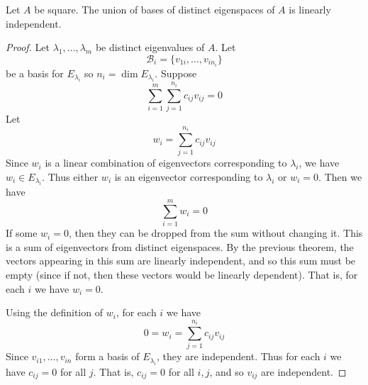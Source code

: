 \documentclass{article}
\begin{document}
    \begin{theorem}
      Let $A$ be square. The union of bases of distinct eigenspaces of $A$ is linearly independent.
    \end{theorem}
    \begin{proof}
      Let $\lambda_1, \ldots, \lambda_m$ be distinct eigenvalues of $A$. Let \[
        \mathcal{B}_i = \{v_{1i}, \dots, v_{in_i}\}
      \] be a basis for $E_{\lambda_i}$ so $n_i = \dim E_{\lambda_i}$. Suppose \[
        \sum_{i=1}^m\sum_{j=1}^{n_i} c_{ij}v_{ij} = 0
      \]
      Let \[
        w_i = \sum_{j=1}^{n_i} c_{ij}v_{ij}
      \]
      Since $w_i$ is a linear combination of eigenvectors corresponding to $\lambda_i$, we have $w_i \in E_{\lambda_i}$. Thus either $w_i$ is an eigenvector corresponding to $\lambda_i$ or $w_i = 0$. Then we have \[
        \sum_{i=1}^m w_i = 0
      \]
      If some $w_i = 0$, then they can be dropped from the sum without changing it. This is a sum of eigenvectors from distinct eigenspaces. By the previous theorem, the vectors appearing in this sum are linearly independent, and so this sum must be empty (since if not, then these vectors would be linearly dependent). That is, for each $i$ we have $w_i = 0$.

      Using the definition of $w_i$, for each $i$ we have \[
        0 = w_i = \sum_{j=1}^{n_i} c_{ij}v_{ij}
      \]
      Since $v_{i1}, \ldots, v_{in}$ form a basis of $E_{\lambda_i}$, they are independent. Thus for each $i$ we have $c_{ij} = 0$ for all $j$. That is, $c_{ij} = 0$ for all $i, j$, and so $v_{ij}$ are independent.
    \end{proof}
\end{document}
